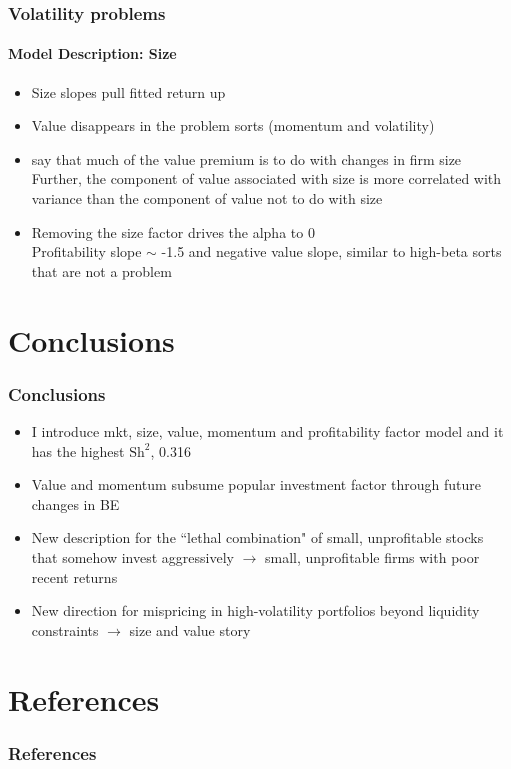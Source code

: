 \documentclass[notes]{beamer}  %
\begin{document}
\begin{frame} \frametitle{Volatility problems} \framesubtitle{Model Description: Size}
  \begin{itemize}
    \item Size slopes pull fitted return up
    \item Value disappears in the problem sorts (momentum and volatility)
    \item \textcite{gerakos2017decomposing} say that much of the value premium is to do with changes in firm size\\
    Further, the component of value associated with size is more correlated with variance than the component of value not to do with size
    \item Removing the size factor drives the alpha to 0\\
    Profitability slope $\sim$ -1.5 and negative value slope, similar to high-beta sorts that are not a problem
  \end{itemize}
\end{frame}

\section{Conclusions}

\begin{frame} \frametitle{Conclusions}
  \begin{itemize}
    \item I introduce mkt, size, value, momentum and profitability factor model and it has the highest $\text{Sh}^2$, 0.316
    \item Value and momentum subsume popular investment factor through future changes in BE
    \item New description for the ``lethal combination" of small, unprofitable stocks that somehow invest aggressively $\rightarrow$ small, unprofitable firms with poor recent returns
    \item New direction for mispricing in high-volatility portfolios beyond liquidity constraints $\rightarrow$ size and value story
  \end{itemize}
\end{frame}

\section{References}

\begin{frame}[allowframebreaks]
  \frametitle{References}
  \printbibliography
\end{frame}
\end{document}
